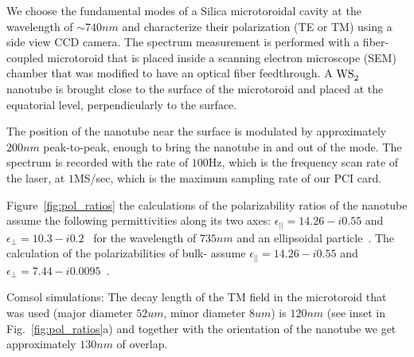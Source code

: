 \documentclass[journal=jacsat,manuscript=article]{achemso}
\begin{document}
\begin{suppinfo}

We choose the fundamental modes of a Silica microtoroidal cavity at the wavelength of $\sim740nm$ and characterize their polarization (TE or TM) using a side view CCD camera.
The spectrum measurement is performed with a fiber-coupled microtoroid that is placed inside a scanning electron microscope (SEM) chamber that was modified to have an optical fiber feedthrough. A $\ce{WS_2}$ nanotube is brought close to the surface of the microtoroid and placed at the equatorial level, perpendicularly to the surface.

The position of the nanotube near the surface is modulated by approximately $200nm$ peak-to-peak, enough to bring the nanotube in and out of the mode. The spectrum is recorded with the rate of $100$Hz, which is the frequency scan rate of the laser, at $1$MS/sec, which is the maximum sampling rate of our PCI card.

Figure~\ref{fig:pol_ratios} the calculations of the polarizability ratios of the nanotube assume the following permittivities along its two axes: $\epsilon_{||}=14.26-i0.55$ and $\epsilon_{\perp}=10.3-i0.2$~\cite{taverna2002,kociak2001experimental} for the wavelength of $735nm$ and an ellipsoidal particle~\cite{hulst1957light}. The calculation of the polarizabilities of bulk- assume $\epsilon_{||}=14.26-i0.55$ and $\epsilon_{\perp}=7.44-i0.0095$~\cite{taverna2002}.

Comsol simulations: The decay length of the TM field in the microtoroid that was used (major diameter $52um$, minor diameter $8um$) is $120nm$  (see inset in Fig.~\ref{fig:pol_ratios}a) and together with the orientation of the nanotube we get approximately $130nm$ of overlap.


\end{suppinfo}
\end{document}
